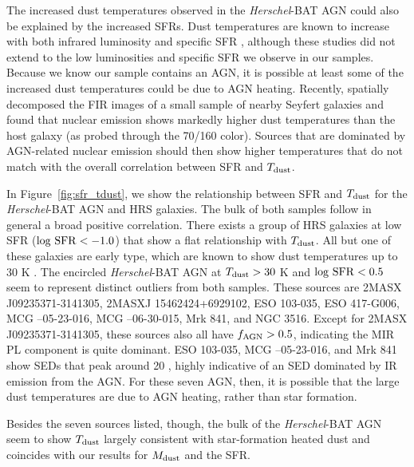 \documentclass[fleqn, usenatbib]{mnras}
\newcommand{\herschel}{\emph{Herschel}}
\newcommand{\mdust}{$M_{\rm dust}$}
\newcommand{\tdust}{$T_{\rm dust}$}
\begin{document}
The increased dust temperatures observed in the \herschel-BAT AGN could also be explained by the increased SFRs. Dust temperatures are known to increase with both infrared luminosity and specific SFR \citep[e.g][]{Chapman:2003jk, Symeonidis:2013fe, Cortese:2014qq, Magnelli:2014sf}, although these studies did not extend to the low luminosities and specific SFR we observe in our samples. Because we know our sample contains an AGN, it is possible at least some of the increased dust temperatures could be due to AGN heating. Recently, \citet{Garcio-Gonzalez:2016bk} spatially decomposed the FIR images of a small sample of nearby Seyfert galaxies and found that nuclear emission shows markedly higher dust temperatures than the host galaxy (as probed through the 70/160 \micron{} color). Sources that are dominated by AGN-related nuclear emission should then show higher temperatures that do not match with the overall correlation between SFR and $T_{\rm dust}$. 

In Figure~\ref{fig:sfr_tdust}, we show the relationship between SFR and $T_{\rm dust}$ for the \herschel-BAT AGN and HRS galaxies. The bulk of both samples follow in general a broad positive correlation. There exists a group of HRS galaxies at low SFR ($\log\,\rm{SFR} < -1.0$) that show a flat relationship with $T_{\rm dust}$. All but one of these galaxies are early type, which are known to show dust temperatures up to 30 K \citep{Temi:2007ty}. The encircled \herschel-BAT AGN at $T_{\rm dust} > 30$ K and $\log\,\rm{SFR} < 0.5$ seem to represent distinct outliers from both samples. These sources are 2MASX J09235371-3141305, 2MASXJ 15462424+6929102, ESO 103-035, ESO 417-G006, MCG --05-23-016, MCG --06-30-015, Mrk 841, and NGC 3516. Except for  2MASX J09235371-3141305, these sources also all have $f_{\rm AGN} > 0.5$, indicating the MIR PL component is quite dominant. ESO 103-035, MCG --05-23-016, and Mrk 841 show SEDs that peak around 20 \micron, highly indicative of an SED dominated by IR emission from the AGN. For these seven AGN, then, it is possible that the large dust temperatures are due to AGN heating, rather than star formation.

Besides the seven sources listed, though, the bulk of the \herschel-BAT AGN seem to show \tdust{} largely consistent with star-formation heated dust and coincides with our results for \mdust{} and the SFR. 
\end{document}
